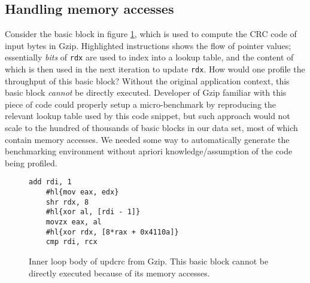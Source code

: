 \subsection{Handling memory accesses}
Consider the basic block in figure \ref{fig:mem-ex},
which is used to compute the CRC code of input bytes in Gzip.
Highlighted instructions shows the flow of pointer values;
essentially \textit{bits} of \verb|rdx| are used to index into a lookup table, 
and the content of which is then used in the next iteration to 
update \verb|rdx|.
How would one profile the throughput of this basic block?
Without the original application context,
this basic block \textit{cannot} be directly executed.
Developer of Gzip familiar with this piece of code could 
properly setup a micro-benchmark by reproducing the
relevant lookup table used by this code snippet,
but such approach would not scale to the hundred of 
thousands of basic blocks in our data set, most of which contain memory accesses.
We needed some way to automatically generate the benchmarking environment
without apriori knowledge/assumption of the code being profiled.

\begin{figure}[h]
\begin{Verbatim}[commandchars=\#\{\}]
    add rdi, 1
    #hl{mov eax, edx}
    shr rdx, 8
    #hl{xor al, [rdi - 1]}
    movzx eax, al
    #hl{xor rdx, [8*rax + 0x4110a]}
    cmp rdi, rcx
\end{Verbatim}
\caption{Inner loop body of updcrc from Gzip.
This basic block cannot be directly executed because
of its memory accesses.}
\label{fig:mem-ex}
\end{figure}

